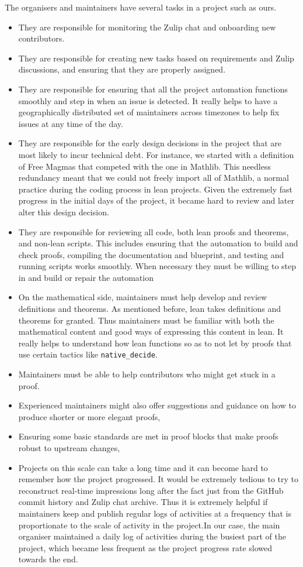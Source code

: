 The organisers and maintainers have several tasks in a project such as ours.
\begin{itemize}
    \item They are responsible for monitoring the Zulip chat and onboarding new contributors.
    \item They are responsible for creating new tasks based on requirements and Zulip discussions, and ensuring that they are properly assigned.
    \item They are responsible for ensuring that all the project automation functions smoothly and step in when an issue is detected. It really helps to have a geographically distributed set of maintainers across timezones to help fix issues at any time of the day.
    \item They are responsible for the early design decisions in the project that are most likely to incur technical debt. For instance, we started with a definition of Free Magmas that competed with the one in Mathlib. This needless redundancy meant that we could not freely import all of Mathlib, a normal practice during the coding process in lean projects. Given the extremely fast progress in the initial days of the project, it became hard to review and later alter this design decision.
    \item They are responsible for reviewing all code, both lean proofs and theorems, and non-lean scripts. This includes ensuring that the automation to build and check proofs, compiling the documentation and blueprint, and testing and running scripts works smoothly. When necessary they must be willing to step in and build or repair the automation
    \item On the mathematical side, maintainers must help develop and review definitions and theorems. As mentioned before, lean takes definitions and theorems for granted. Thus maintainers must be familiar with both the mathematical content and good ways of expressing this content in lean. It really helps to understand how lean functions so as to not let by proofs that use certain tactics like \texttt{native\_decide}.
    \item Maintainers must be able to help contributors who might get stuck in a proof.
    \item Experienced maintainers might also offer suggestions and guidance on how to produce shorter or more elegant proofs,
    \item Ensuring some basic standards are met in proof blocks that make proofs robust to upstream changes,
    \item Projects on this scale can take a long time and it can become hard to remember how the project progressed. It would be extremely tedious to try to reconstruct real-time impressions long after the fact just from the GitHub commit history and Zulip chat archive. Thus it is extremely helpful if maintainers keep and publish regular logs of activities at a frequency that is proportionate to the scale of activity in the project.In our case, the main organiser maintained a daily log of activities during the busiest part of the project, which became less frequent as the project progress rate slowed towards the end.
\end{itemize}

